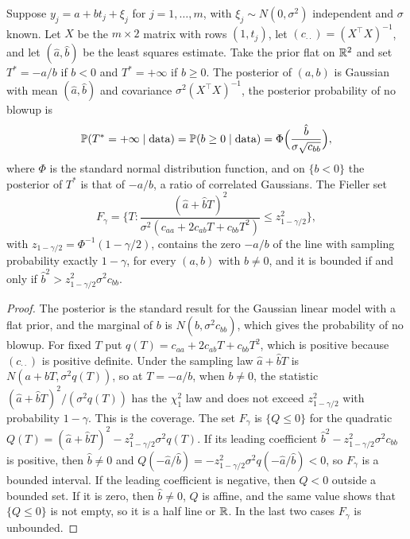 \begin{proposition}
\label{prop:blowup_time}
Suppose $y_j = a+bt_j+\xi_j$ for $j = 1,\dots,m$, with $\xi_j\sim N(0,\sigma^2)$ independent and $\sigma$ known. Let $X$ be the $m\times2$ matrix with rows $(1,t_j)$, let $(c_{\cdot\cdot}) = (X^\top X)^{-1}$, and let $(\hat a,\hat b)$ be the least squares estimate. Take the prior flat on $\R^2$ and set $T^* = -a/b$ if $b<0$ and $T^* = +\infty$ if $b\geq0$. The posterior of $(a,b)$ is Gaussian with mean $(\hat a,\hat b)$ and covariance $\sigma^2(X^\top X)^{-1}$, the posterior probability of no blowup is
\[
\P(T^* = +\infty\mid\text{data}) = \P(b\geq0\mid\text{data}) = \Phi\Big(\frac{\hat b}{\sigma\sqrt{c_{bb}}}\Big),
\]
where $\Phi$ is the standard normal distribution function, and on $\{b<0\}$ the posterior of $T^*$ is that of $-a/b$, a ratio of correlated Gaussians. The Fieller set~\cite{fieller1954}
\[
F_\gamma = \Big\{T:\frac{(\hat a+\hat bT)^2}{\sigma^2(c_{aa}+2c_{ab}T+c_{bb}T^2)}\leq z_{1-\gamma/2}^2\Big\},
\]
with $z_{1-\gamma/2} = \Phi^{-1}(1-\gamma/2)$, contains the zero $-a/b$ of the line with sampling probability exactly $1-\gamma$, for every $(a,b)$ with $b\neq0$, and it is bounded if and only if $\hat b^2>z_{1-\gamma/2}^2\sigma^2c_{bb}$.
\end{proposition}

\begin{proof}
The posterior is the standard result for the Gaussian linear model with a flat prior, and the marginal of $b$ is $N(\hat b,\sigma^2c_{bb})$, which gives the probability of no blowup. For fixed $T$ put $q(T) = c_{aa}+2c_{ab}T+c_{bb}T^2$, which is positive because $(c_{\cdot\cdot})$ is positive definite. Under the sampling law $\hat a+\hat bT$ is $N(a+bT,\sigma^2q(T))$, so at $T = -a/b$, when $b\neq0$, the statistic $(\hat a+\hat bT)^2/(\sigma^2q(T))$ has the $\chi^2_1$ law and does not exceed $z_{1-\gamma/2}^2$ with probability $1-\gamma$. This is the coverage. The set $F_\gamma$ is $\{Q\leq0\}$ for the quadratic $Q(T) = (\hat a+\hat bT)^2-z_{1-\gamma/2}^2\sigma^2q(T)$. If its leading coefficient $\hat b^2-z_{1-\gamma/2}^2\sigma^2c_{bb}$ is positive, then $\hat b\neq0$ and $Q(-\hat a/\hat b) = -z_{1-\gamma/2}^2\sigma^2q(-\hat a/\hat b)<0$, so $F_\gamma$ is a bounded interval. If the leading coefficient is negative, then $Q<0$ outside a bounded set. If it is zero, then $\hat b\neq0$, $Q$ is affine, and the same value shows that $\{Q\leq0\}$ is not empty, so it is a half line or $\R$. In the last two cases $F_\gamma$ is unbounded.
\end{proof}

